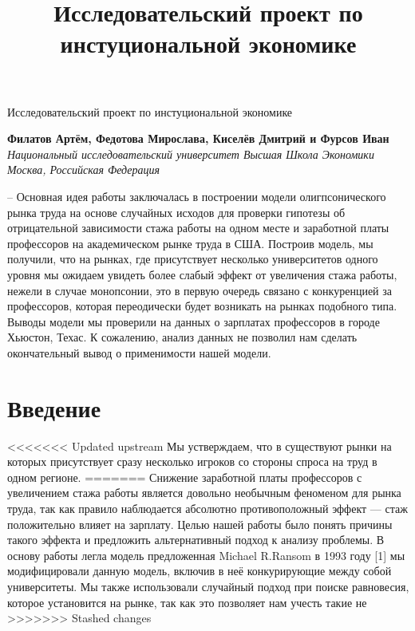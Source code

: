 \documentclass[a4paper, 12pt]{article}
\title{Исследовательский проект по инстуциональной экономике}
\theoremstyle{definition}
\theoremstyle{plain}
\begin{document}
\begin{center}
{\Large\sc Исследовательский проект по инстуциональной экономике}\vspace{0.2cm}\\
\end{center}
\begin{center}
{\bf Филатов Артём, Федотова Мирослава, Киселёв Дмитрий и Фурсов Иван}\vspace{0.1cm}\\
{\it Национальный исследовательский университет Высшая Школа Экономики\\ 
Москва, Российская Федерация}\vspace{0.1cm}\\
\end{center}


-- Основная идея работы заключалась в построении модели олигпсонического рынка труда на основе случайных исходов для проверки гипотезы об отрицательной зависимости стажа работы на одном месте и заработной платы профессоров на академическом рынке труда в США. Построив модель, мы получили, что на рынках, где присутствует несколько университетов одного уровня мы ожидаем увидеть более слабый эффект от увеличения стажа работы,  нежели в случае монопсонии, это в первую очередь связано с конкуренцией за профессоров, которая переодически будет возникать на рынках подобного типа. Выводы модели мы проверили на данных о зарплатах профессоров в городе Хьюстон, Техас. К сожалению, анализ данных не позволил нам сделать окончательный вывод о применимости нашей модели. 

\section{Введение}
<<<<<<< Updated upstream
Мы устверждаем, что в существуют рынки на которых присутствует сразу несколько игроков со стороны спроса на труд в одном регионе. 
=======
Снижение заработной платы профессоров с увеличением стажа работы является довольно необычным феноменом для рынка труда, так как правило наблюдается абсолютно противоположный эффект --- стаж положительно влияет на зарплату.  Целью нашей работы было понять причины такого эффекта и предложить альтернативный подход к анализу проблемы. В основу работы легла модель предложенная Michael R.Ransom в 1993 году [1] мы модифицировали данную модель, включив в неё конкурирующие между собой университеты. Мы также использовали случайный подход при поиске равновесия, которое установится на рынке, так как это позволяет нам учесть такие не
>>>>>>> Stashed changes
\end{document}
